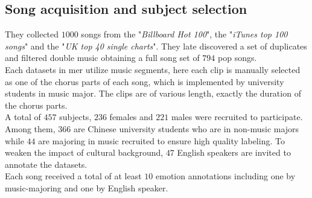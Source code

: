 \subsection{Song acquisition and subject selection}
They collected $1000$ songs from the "\textit{Billboard Hot 100}", the "\textit{iTunes top 100 songs}" and the "\textit{UK top 40 single charts}". They late discovered a set of duplicates and filtered double music obtaining a full song set of $794$ pop songs.
\\
Each datasets in \gls{mer} utilize music segments, here each clip is manually selected as one of the chorus parts of each song, which is implemented by university students in music major. The clips are of various length, exactly the duration of the chorus parts.
\\ \indent
A total of $457$ subjects, $236$ females and $221$ males were recruited to participate. Among them, $366$ are Chinese university students who are in non-music majors while $44$ are majoring in music recruited to ensure high quality labeling. To weaken the impact of cultural background, $47$ English speakers are invited to annotate the datasets.
\\
Each song received a total of at least $10$ emotion annotations including one by music-majoring and one by English speaker.

